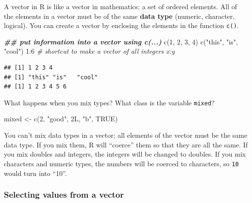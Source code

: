 \documentclass[
  oneside]{book}
\newenvironment{Shaded}{\begin{snugshade}}{\end{snugshade}}
\newcommand{\CommentTok}[1]{\textcolor[rgb]{0.56,0.35,0.01}{\textit{#1}}}
\newcommand{\ConstantTok}[1]{\textcolor[rgb]{0.00,0.00,0.00}{#1}}
\newcommand{\DecValTok}[1]{\textcolor[rgb]{0.00,0.00,0.81}{#1}}
\newcommand{\DocumentationTok}[1]{\textcolor[rgb]{0.56,0.35,0.01}{\textbf{\textit{#1}}}}
\newcommand{\FunctionTok}[1]{\textcolor[rgb]{0.00,0.00,0.00}{#1}}
\newcommand{\NormalTok}[1]{#1}
\newcommand{\OtherTok}[1]{\textcolor[rgb]{0.56,0.35,0.01}{#1}}
\newcommand{\SpecialCharTok}[1]{\textcolor[rgb]{0.00,0.00,0.00}{#1}}
\newcommand{\StringTok}[1]{\textcolor[rgb]{0.31,0.60,0.02}{#1}}
\begin{document}
A vector in R is like a vector in mathematics: a set of ordered elements. All of the elements in a vector must be of the same \textbf{data type} (numeric, character, logical). You can create a vector by enclosing the elements in the function \texttt{c()}.

\begin{Shaded}
\begin{Highlighting}[]
\DocumentationTok{\#\# put information into a vector using c(...)}
\FunctionTok{c}\NormalTok{(}\DecValTok{1}\NormalTok{, }\DecValTok{2}\NormalTok{, }\DecValTok{3}\NormalTok{, }\DecValTok{4}\NormalTok{)}
\FunctionTok{c}\NormalTok{(}\StringTok{"this"}\NormalTok{, }\StringTok{"is"}\NormalTok{, }\StringTok{"cool"}\NormalTok{)}
\DecValTok{1}\SpecialCharTok{:}\DecValTok{6} \CommentTok{\# shortcut to make a vector of all integers x:y}
\end{Highlighting}
\end{Shaded}

\begin{verbatim}
## [1] 1 2 3 4
## [1] "this" "is"   "cool"
## [1] 1 2 3 4 5 6
\end{verbatim}

\begin{try}

What happens when you mix types? What class is the variable \texttt{mixed}?

\begin{Shaded}
\begin{Highlighting}[]
\NormalTok{mixed }\OtherTok{\textless{}{-}} \FunctionTok{c}\NormalTok{(}\DecValTok{2}\NormalTok{, }\StringTok{"good"}\NormalTok{, 2L, }\StringTok{"b"}\NormalTok{, }\ConstantTok{TRUE}\NormalTok{)}
\end{Highlighting}
\end{Shaded}

\end{try}

\begin{warning}
You can't mix data types in a vector; all elements of the vector must be the same data type. If you mix them, R will ``coerce'' them so that they are all the same. If you mix doubles and integers, the integers will be changed to doubles. If you mix characters and numeric types, the numbers will be coerced to characters, so \texttt{10} would turn into ``10''.

\end{warning}

\hypertarget{selecting-values-from-a-vector}{%
\subsubsection{Selecting values from a vector}\label{selecting-values-from-a-vector}}
\end{document}
